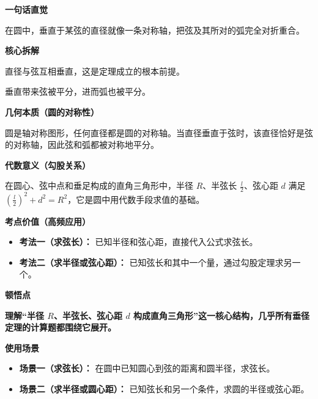 \begin{explanationbox}
	\textbf{\textcolor{CExplanation}{一句话直觉}}

	在圆中，垂直于某弦的直径就像一条对称轴，把弦及其所对的弧完全对折重合。

	\medskip
	\textbf{\textcolor{CExplanation}{核心拆解}}
	\begin{description}[style=nextline, leftmargin=2.8em, labelsep=0.5em, itemsep=0.45em]
		\item[\textbf{要点一（垂直条件）：}] 直径与弦互相垂直，这是定理成立的根本前提。
		\item[\textbf{要点二（平分结论）：}] 垂直带来弦被平分，进而弧也被平分。
	\end{description}

	\medskip
	\textbf{\textcolor{CExplanation}{几何本质（圆的对称性）}}

	圆是轴对称图形，任何直径都是圆的对称轴。当直径垂直于弦时，该直径恰好是弦的对称轴，因此弦和弧都被对称地平分。

	\medskip
	\textbf{\textcolor{CExplanation}{代数意义（勾股关系）}}

	在圆心、弦中点和垂足构成的直角三角形中，半径 $R$、半弦长 $\frac{l}{2}$、弦心距 $d$ 满足 $(\frac{l}{2})^2 + d^2 = R^2$，它是圆中用代数手段求值的基础。

	\medskip
	\textbf{\textcolor{CExplanation}{考点价值（高频应用）}}
	\begin{itemize}[leftmargin=*, itemsep=0.5em, topsep=0.4em]
		\item \textbf{考法一（求弦长）：} 已知半径和弦心距，直接代入公式求弦长。
		\item \textbf{考法二（求半径或弦心距）：} 已知弦长和其中一个量，通过勾股定理求另一个。
	\end{itemize}

	\medskip
	\textbf{\textcolor{CExplanation}{顿悟点}}

	\textbf{理解“半径 $R$、半弦长、弦心距 $d$ 构成直角三角形”这一核心结构，几乎所有垂径定理的计算题都围绕它展开。}

	\medskip
	\textbf{\textcolor{CExplanation}{使用场景}}
	\begin{itemize}[leftmargin=*, itemsep=0.5em, topsep=0.4em]
		\item \textbf{场景一（求弦长）：} 在圆中已知圆心到弦的距离和圆半径，求弦长。
		\item \textbf{场景二（求半径或圆心距）：} 已知弦长和另一个条件，求圆的半径或弦心距。
	\end{itemize}
\end{explanationbox}
